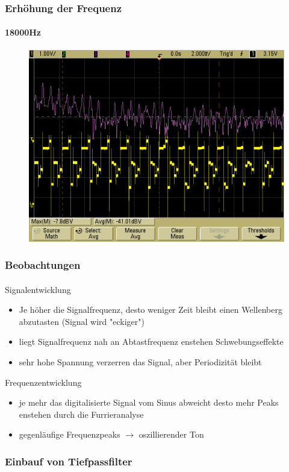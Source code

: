 \begin{frame}
    \frametitle{Erhöhung der Frequenz}
    \framesubtitle{18000Hz}
            \begin{figure}[H]
            \begin{center}
                    \includegraphics[scale=0.2]{./img/oszi/scope_29.png}
            \end{center}
            \end{figure}
\end{frame}
\begin{frame}
    \frametitle{Beobachtungen}
    \framesubtitle{}
    \begin{block}{Signalentwicklung}
        \begin{itemize}
            \item Je höher die Signalfrequenz, desto weniger Zeit bleibt einen
            Wellenberg abzutasten (Signal wird "eckiger")
            \item liegt Signalfrequenz nah an Abtastfrequenz enstehen
            Schwebungseffekte
            \item sehr hohe Spannung verzerren das Signal, aber Periodizität
            bleibt
        \end{itemize}
    \end{block}
    \begin{block}{Frequenzentwicklung}
        \begin{itemize}
            \item je mehr das digitalisierte Signal vom Sinus abweicht desto
            mehr Peaks enstehen durch die Furrieranalyse
            \item gegenläufige Frequenzpeaks $\rightarrow$ oszillierender Ton
        \end{itemize}
    \end{block}
\end{frame}
\begin{frame}
    \frametitle{Einbauf von Tiefpassfilter}
    \framesubtitle{}
    \begin{figure}[H]
    \begin{center}
    \end{center}
    \end{figure}
\end{frame}

